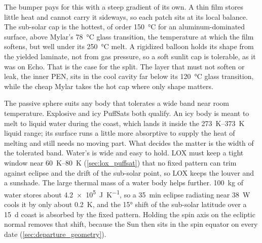\documentclass{article}
\begin{document}
The bumper pays for this with a steep gradient of its own. A thin film stores little heat and cannot carry it sideways, so each patch sits at its local balance. The sub-solar cap is the hottest, of order \SI{150}{\celsius} for an aluminum-dominated surface, above Mylar's \SI{78}{\celsius} glass transition, the temperature at which the film softens, but well under its \SI{250}{\celsius} melt. A rigidized balloon holds its shape from the yielded laminate, not from gas pressure, so a soft sunlit cap is tolerable, as it was on Echo. That is the case for the split. The layer that must not soften or leak, the inner PEN, sits in the cool cavity far below its \SI{120}{\celsius} glass transition, while the cheap Mylar takes the hot cap where only shape matters.

The passive sphere suits any body that tolerates a wide band near room temperature. Explosive and icy PuffSats both qualify. An icy body is meant to melt to liquid water during the coast, which lands it inside the \SIrange{273}{373}{\kelvin} liquid range; its surface runs a little more absorptive to supply the heat of melting and still needs no moving part. What decides the matter is the width of the tolerated band. Water's is wide and easy to hold. LOX must keep a tight window near \SIrange{60}{80}{\kelvin} (\autoref{sec:lox_puffsat}) that no fixed pattern can trim against eclipse and the drift of the sub-solar point, so LOX keeps the louver and a sunshade. The large thermal mass of a water body helps further. \SI{100}{\kilo\gram} of water stores about \SI{4.2e5}{\joule\per\kelvin}, so a \SI{35}{\minute} eclipse radiating near \SI{38}{\watt} cools it by only about \SI{0.2}{\kelvin}, and the \ang{15} shift of the sub-solar latitude over a \SI{15}{\day} coast is absorbed by the fixed pattern. Holding the spin axis on the ecliptic normal removes that shift, because the Sun then sits in the spin equator on every date (\autoref{sec:departure_geometry}).
\end{document}
